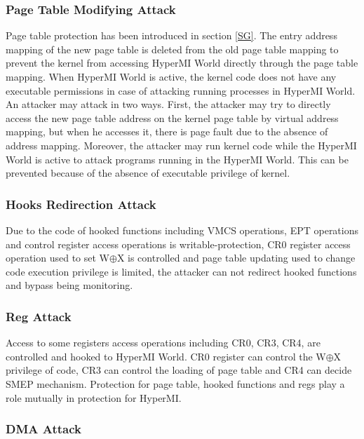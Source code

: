 \documentclass[conference]{IEEEtran}
\begin{document}
\subsubsection{Page Table Modifying Attack}

Page table protection has been introduced in section \ref{SG}. The entry address mapping of the new page table is deleted from the old page table mapping to prevent the kernel from accessing HyperMI World directly through the page table mapping. When HyperMI World is active, the kernel code does not have any executable permissions in case of attacking running processes in HyperMI World. An attacker may attack in two ways.
First, the attacker may try to directly access the new page table address on the kernel page table by virtual address mapping, but when he accesses it, there is page fault due to the absence of address mapping.
Moreover, the attacker may run kernel code while the HyperMI World is active to attack programs running in the HyperMI World. This can be prevented because of the absence of executable privilege of kernel.



\subsubsection{Hooks Redirection Attack}

Due to the code of hooked functions including VMCS operations, EPT operations and  control register access operations is writable-protection, CR0 register access operation used to set W$\oplus${X} is controlled and page table updating used to change code execution privilege is limited, the attacker can not redirect hooked functions and bypass being monitoring.

\subsubsection{Reg Attack}

Access to some registers access operations including CR0, CR3, CR4, are controlled and hooked to HyperMI World. CR0 register can control the W$\oplus${X} privilege of code, CR3 can control the loading of page table and CR4 can decide SMEP mechanism. Protection for page table, hooked functions and regs play a role mutually in protection for HyperMI. 

\subsubsection{DMA Attack}
\end{document}
